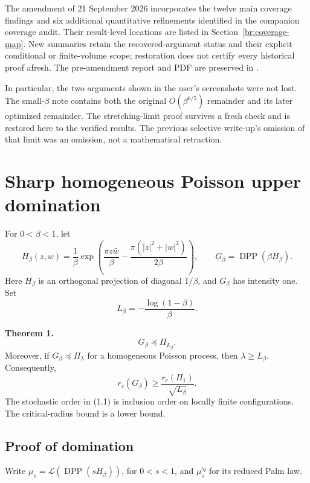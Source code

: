 \documentclass[11pt,a4paper]{article}
\theoremstyle{definition}
\theoremstyle{remark}
\numberwithin{equation}{section}
\begin{document}
The amendment of 21 September 2026 incorporates the twelve main coverage
findings and six additional quantitative refinements identified in the
companion coverage audit. Their result-level locations are listed in
Section~\ref{br:coverage-map}. New summaries retain the recovered-argument
status and their explicit conditional or finite-volume scope; restoration
does not certify every historical proof afresh. The pre-amendment report
and PDF are preserved in .

In particular, the two arguments shown in the user's screenshots were
not lost. The small-\(\beta\) note contains both the original
\(O(\beta^{6/5})\) remainder and its later optimized remainder.
The stretching-limit proof survives a fresh check and is restored here
to the verified results. The previous selective write-up's omission of
that limit was an omission, not a mathematical retraction.
\clearpage


\hypertarget{sharp-homogeneous-poisson-upper-domination}{%
\section{Sharp homogeneous Poisson upper domination}\label{sharp-homogeneous-poisson-upper-domination}}

For \(0<\beta<1\), let \[
H_\beta(z,w)=\frac1\beta
\exp\!\left(\frac{\pi z\bar w}{\beta}
 -\frac{\pi(|z|^2+|w|^2)}{2\beta}\right),\qquad
G_\beta=\operatorname{DPP}(\beta H_\beta).
\] Here \(H_\beta\) is an orthogonal projection of diagonal \(1/\beta\), and \(G_\beta\) has intensity one. Set \[
L_\beta=-\frac{\log(1-\beta)}{\beta}.
\]

\textbf{Theorem 1.} \[
G_\beta\preceq\Pi_{L_\beta}.
\tag{1.1}
\] Moreover, if \(G_\beta\preceq\Pi_\lambda\) for a homogeneous Poisson process, then \(\lambda\ge L_\beta\). Consequently, \[
\boxed{\quad
r_c(G_\beta)\ge\frac{r_c(\Pi_1)}{\sqrt{L_\beta}}.
\quad}
\tag{1.2}
\] The stochastic order in (1.1) is inclusion order on locally finite configurations. The critical-radius bound is a lower bound.

\hypertarget{proof-of-domination}{%
\subsection{Proof of domination}\label{proof-of-domination}}

Write \(\mu_s=\mathcal L(\operatorname{DPP}(sH_\beta))\), for \(0<s<1\), and \(\mu_s^{!q}\) for its reduced Palm law.
\end{document}

